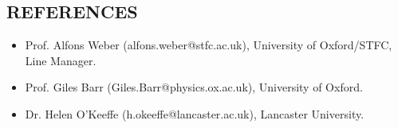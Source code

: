 \documentclass[margin]{res}
\begin{document}
\begin{resume}
\section{REFERENCES}
\begin{itemize}
  \item Prof. Alfons Weber (alfons.weber@stfc.ac.uk), University of Oxford/STFC,\\ Line Manager. 
  \item Prof. Giles Barr (Giles.Barr@physics.ox.ac.uk), University of Oxford.
  \item Dr. Helen O'Keeffe (h.okeeffe@lancaster.ac.uk), Lancaster University.
\end{itemize}
\end{resume} 
\end{document}
